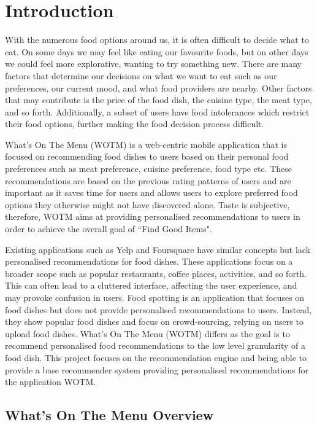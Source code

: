 \chapter{Introduction}\label{C:intro}

With the numerous food options around us, it is often difficult to decide what to eat. On some days we may feel like eating our favourite foods, but on other days we could feel more explorative, wanting to try something new. There are many factors that determine our decisions on what we want to eat such as our preferences, our current mood, and what food providers are nearby. Other factors that may contribute is the price of the food dish, the cuisine type, the meat type, and so forth. Additionally, a subset of users have food intolerances which restrict their food options, further making the food decision process difficult.

What’s On The Menu (WOTM) is a web-centric mobile application that is focused on recommending food dishes to users based on their personal food preferences such as meat preference, cuisine preference, food type etc. These recommendations are based on the previous rating patterns of users and are important as it saves time for users and allows users to explore preferred food options they otherwise might not have discovered alone. Taste is subjective, therefore, WOTM aims at providing personalised recommendations to users in order to achieve the overall goal of ``Find Good Items".

Existing applications such as Yelp \cite{yelp} and Foursquare \cite{foursquare} have similar concepts but lack personalised recommendations for food dishes. These applications focus on a broader scope such as popular restaurants, coffee places, activities, and so forth. This can often lead to a cluttered interface, affecting the user experience, and may provoke confusion in users. Food spotting is an application that focuses on food dishes but does not provide personalised recommendations to users. Instead, they show popular food dishes and focus on crowd-sourcing, relying on users to upload food dishes. What's On The Menu (WOTM) differs as the goal is to recommend personalised food recommendations to the low level granularity of a food dish. This project focuses on the recommendation engine and being able to provide a base recommender system providing personalised recommendations for the application WOTM.

\section{What's On The Menu Overview} \label{section:wotm}

